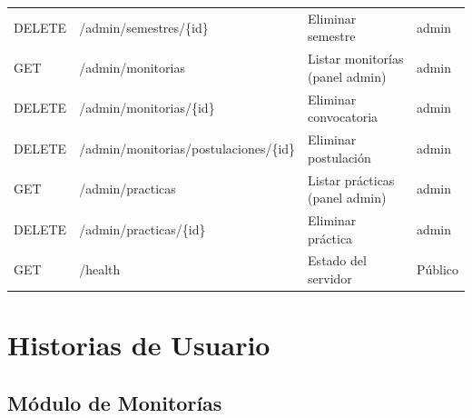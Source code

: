 \documentclass[12pt,a4paper]{article}
\begin{document}
\begin{longtable}{>{\ttfamily}p{1.5cm} >{\ttfamily}p{6.5cm} p{3.5cm} p{2cm}}
  DELETE & /admin/semestres/\{id\} & Eliminar semestre & admin \\
  GET    & /admin/monitorias & Listar monitorías (panel admin) & admin \\
  DELETE & /admin/monitorias/\{id\} & Eliminar convocatoria & admin \\
  DELETE & /admin/monitorias/postulaciones/\{id\} & Eliminar postulación & admin \\
  GET    & /admin/practicas & Listar prácticas (panel admin) & admin \\
  DELETE & /admin/practicas/\{id\} & Eliminar práctica & admin \\
  GET    & /health & Estado del servidor & Público \\
  \bottomrule
\end{longtable}

\newpage
\section{Historias de Usuario}

\subsection{Módulo de Monitorías}
\end{document}
